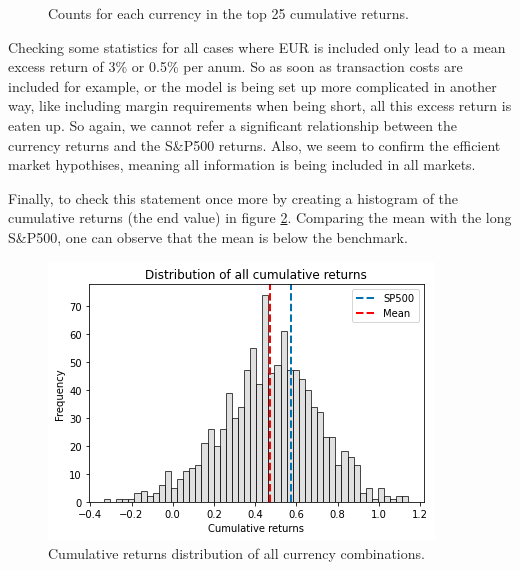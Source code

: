 \newpage

\begin{figure}[h]
  \centering
  \caption{Counts for each currency in the top 25 cumulative returns.}
  \label{fig: combination_counts}
\end{figure}

\noindent Checking some statistics for all cases where EUR is included only lead to a mean excess return of 3\% or 0.5\% per anum. So as soon as transaction costs are included for example, or the model is being set up more complicated in another way, like including margin requirements when being short, all this excess return is eaten up. So again, we cannot refer a significant relationship between the currency returns and the S\&P500 returns. Also, we seem to confirm the efficient market hypothises, meaning all information is being included in all markets.

\noindent Finally, to check this statement once more by creating a histogram of the cumulative returns (the end value) in figure \ref{fig: cumreturns histogram}. Comparing the mean with the long S\&P500, one can observe that the mean is below the benchmark.

\begin{figure}[h!]
\begin{center}
  \includegraphics[width=\textwidth]{images/hist_comparison.png}
  \end{center}
  \caption{Cumulative returns distribution of all currency combinations.}
  \label{fig: cumreturns histogram}
\end{figure}


